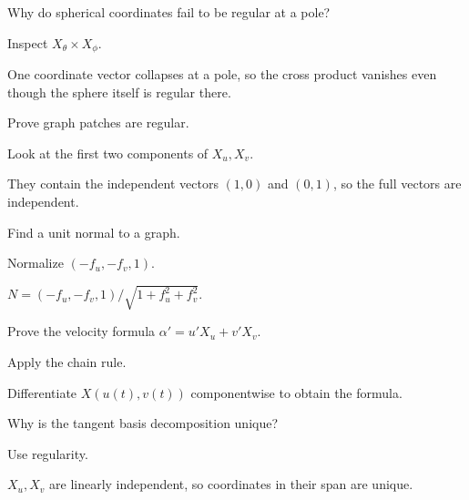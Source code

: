 \begin{exercise}\label{exr:vii14-06}
Why do spherical coordinates fail to be regular at a pole?
\end{exercise}
\begin{hint}
Inspect \(X_\theta\times X_\phi\).
\end{hint}
\begin{solution}
One coordinate vector collapses at a pole, so the cross product vanishes even though the sphere itself is regular there.
\end{solution}

\begin{exercise}\label{exr:vii14-07}
Prove graph patches are regular.
\end{exercise}
\begin{hint}
Look at the first two components of \(X_u,X_v\).
\end{hint}
\begin{solution}
They contain the independent vectors \((1,0)\) and \((0,1)\), so the full vectors are independent.
\end{solution}

\begin{exercise}\label{exr:vii14-08}
Find a unit normal to a graph.
\end{exercise}
\begin{hint}
Normalize \((-f_u,-f_v,1)\).
\end{hint}
\begin{solution}
\(N=(-f_u,-f_v,1)/\sqrt{1+f_u^2+f_v^2}\).
\end{solution}

\begin{exercise}\label{exr:vii14-09}
Prove the velocity formula \(\alpha'=u'X_u+v'X_v\).
\end{exercise}
\begin{hint}
Apply the chain rule.
\end{hint}
\begin{solution}
Differentiate \(X(u(t),v(t))\) componentwise to obtain the formula.
\end{solution}

\begin{exercise}\label{exr:vii14-10}
Why is the tangent basis decomposition unique?
\end{exercise}
\begin{hint}
Use regularity.
\end{hint}
\begin{solution}
\(X_u,X_v\) are linearly independent, so coordinates in their span are unique.
\end{solution}

